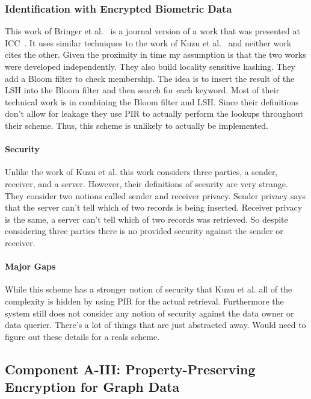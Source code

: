 \subsubsection{Identification with Encrypted Biometric Data}
This work of Bringer et al.~\cite{bringer2011identification} is a journal version of a work that was presented at ICC~\cite{bringer2009error}.  It uses similar techniques to the work of Kuzu et al.~\cite{kuzu2012efficient} and neither work cites the other.  Given the proximity in time my assumption is that the two works were developed independently.  They also build locality sensitive hashing.  They add a Bloom filter to check membership.  The idea is to insert the result of the LSH into the Bloom filter and then search for each keyword.  Most of their technical work is in combining the Bloom filter and LSH.  Since their definitions don't allow for leakage they use PIR to actually perform the lookups throughout their scheme.  Thus, this scheme is unlikely to actually be implemented.


\paragraph{Security} Unlike the work of Kuzu et al. this work considers three parties, a sender, receiver, and a server.  However, their definitions of security are very strange.  They consider two notions called sender and receiver privacy.  Sender privacy says that the server can't tell which of two records is being inserted.  Receiver privacy is the same, a server can't tell which of two records was retrieved.  So despite considering three parties there is no provided security against the sender or receiver.

\paragraph{Major Gaps}  While this scheme has a stronger notion of security that Kuzu et al. all of the complexity is hidden by using PIR for the actual retrieval.  Furthermore the system still does not consider any notion of security against the data owner or data querier.  There's a lot of things that are just abstracted away.  Would need to figure out these details for a reals scheme.

\subsection{Component A-III:  Property-Preserving Encryption for Graph Data} 

